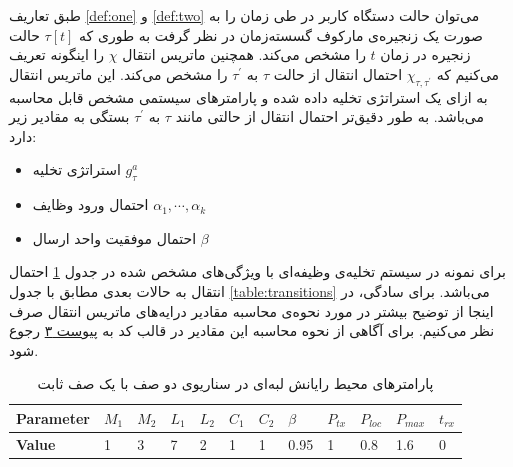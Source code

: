طبق تعاریف \ref{def:one} و \ref{def:two} می‌توان حالت دستگاه کاربر در طی زمان را به صورت یک زنجیره‌ی مارکوف گسسته‌زمان در نظر گرفت به طوری که $\tau[t]$ حالت زنجیره در زمان $t$ را مشخص می‌کند. همچنین ماتریس انتقال $\chi$ را اینگونه تعریف می‌کنیم که $\chi_{\tau, \tau^{\prime}}$ احتمال انتقال از حالت $\tau$ به \(\tau^{\prime}\) را مشخص می‌کند. این ماتریس انتقال به ازای یک استراتژی تخلیه داده شده و پارامترهای سیستمی مشخص قابل محاسبه می‌باشد. به طور دقیق‌تر احتمال انتقال از حالتی مانند 
$\tau$
به 
$\tau^\prime$
بستگی به مقادیر زیر دارد:
\begin{itemize}
	\item استراتژی تخلیه $g_\tau^a$
	\item احتمال ورود وظایف $\alpha_1, \cdots, \alpha_k$
	\item احتمال موفقیت واحد ارسال $\beta$
\end{itemize}
برای نمونه در سیستم تخلیه‌ی وظیفه‌ای با ویژگی‌های مشخص شده در جدول \ref{table:fixedranged2} احتمال انتقال به حالات بعدی مطابق با جدول \ref{table:transitions} می‌باشد. برای سادگی، در اینجا از توضیح بیشتر در مورد نحوه‌ی محاسبه مقادیر درایه‌های ماتریس انتقال صرف نظر می‌کنیم. برای آگاهی از نحوه محاسبه این مقادیر در قالب کد به \hyperref[appendix:3]{پیوست ۳} رجوع شود.
\begin{table}[H]
	\centering
	\begin{latin}
		\begin{tabular}{@{}llllllllllll@{}}
			\toprule
			\textbf{Parameter} & $M_1$ & $M_2$ & $L_1$ & $L_2$ & $C_1$ & $C_2$ & $\beta$ & $P_{tx}$ & $P_{loc}$ & $P_{max}$ & $t_{rx}$ \\ \midrule
			\textbf{Value}     & 1     & 3     & 7     & 2     & 1     & 1     & 0.95    & 1        & 0.8       & 1.6       & 0        \\ \bottomrule
		\end{tabular}
	\end{latin}
	\caption{پارامترهای محیط رایانش لبه‌ای در سناریوی دو صف با یک صف ثابت}
	\label{table:fixedranged2}
\end{table}

